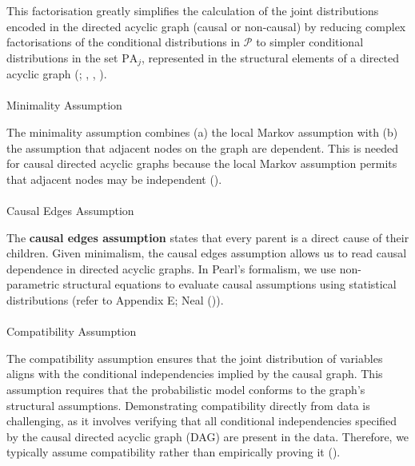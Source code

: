 \documentclass[
  single column]{article}
\makeatletter
\let\oldparagraph\paragraph
\renewcommand{\paragraph}{
    \@ifstar
      \xxxParagraphStar
      \xxxParagraphNoStar
  }
\newcommand{\xxxParagraphStar}[1]{\oldparagraph*{#1}\mbox{}}
\newcommand{\xxxParagraphNoStar}[1]{\oldparagraph{#1}\mbox{}}
\makeatother
\begin{document}
This factorisation greatly simplifies the calculation of the joint
distributions encoded in the directed acyclic graph (causal or
non-causal) by reducing complex factorisations of the conditional
distributions in \(\mathcal{P}\) to simpler conditional distributions in
the set \(\text{PA}_j\), represented in the structural elements of a
directed acyclic graph (; ,
, ).

\paragraph{Minimality Assumption}\label{minimality-assumption}

The minimality assumption combines (a) the local Markov assumption with
(b) the assumption that adjacent nodes on the graph are dependent. This
is needed for causal directed acyclic graphs because the local Markov
assumption permits that adjacent nodes may be independent
().

\paragraph{Causal Edges Assumption}\label{causal-edges-assumption}

The \textbf{causal edges assumption} states that every parent is a
direct cause of their children. Given minimalism, the causal edges
assumption allows us to read causal dependence in directed acyclic
graphs. In Pearl's formalism, we use non-parametric structural equations
to evaluate causal assumptions using statistical distributions (refer to
Appendix E; Neal ()).

\paragraph{Compatibility Assumption}\label{compatibility-assumption}

The compatibility assumption ensures that the joint distribution of
variables aligns with the conditional independencies implied by the
causal graph. This assumption requires that the probabilistic model
conforms to the graph's structural assumptions. Demonstrating
compatibility directly from data is challenging, as it involves
verifying that all conditional independencies specified by the causal
directed acyclic graph (DAG) are present in the data. Therefore, we
typically assume compatibility rather than empirically proving it
().
\end{document}
